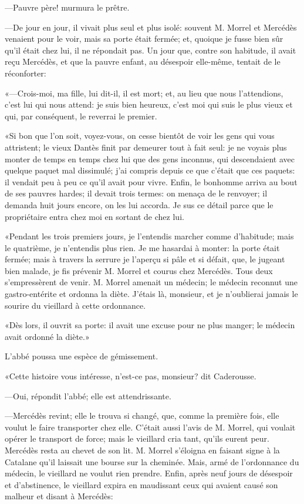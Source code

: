 —Pauvre père! murmura le prêtre.

—De jour en jour, il vivait plus seul et plus isolé: souvent M. Morrel et Mercédès venaient pour le voir, mais sa porte était fermée; et, quoique je fusse bien sûr qu'il était chez lui, il ne répondait pas. Un jour que, contre son habitude, il avait reçu Mercédès, et que la pauvre enfant, au désespoir elle-même, tentait de le réconforter:

«—Crois-moi, ma fille, lui dit-il, il est mort; et, au lieu que nous l'attendions, c'est lui qui nous attend: je suis bien heureux, c'est moi qui suis le plus vieux et qui, par conséquent, le reverrai le premier.

«Si bon que l'on soit, voyez-vous, on cesse bientôt de voir les gens qui vous attristent; le vieux Dantès finit par demeurer tout à fait seul: je ne voyais plus monter de temps en temps chez lui que des gens inconnus, qui descendaient avec quelque paquet mal dissimulé; j'ai compris depuis ce que c'était que ces paquets: il vendait peu à peu ce qu'il avait pour vivre. Enfin, le bonhomme arriva au bout de ses pauvres hardes; il devait trois termes: on menaça de le renvoyer; il demanda huit jours encore, on les lui accorda. Je sus ce détail parce que le propriétaire entra chez moi en sortant de chez lui.

«Pendant les trois premiers jours, je l'entendis marcher comme d'habitude; mais le quatrième, je n'entendis plus rien. Je me hasardai à monter: la porte était fermée; mais à travers la serrure je l'aperçu si pâle et si défait, que, le jugeant bien malade, je fis prévenir M. Morrel et courus chez Mercédès. Tous deux s'empressèrent de venir. M. Morrel amenait un médecin; le médecin reconnut une gastro-entérite et ordonna la diète. J'étais là, monsieur, et je n'oublierai jamais le sourire du vieillard à cette ordonnance.

«Dès lors, il ouvrit sa porte: il avait une excuse pour ne plus manger; le médecin avait ordonné la diète.»

L'abbé poussa une espèce de gémissement.

«Cette histoire vous intéresse, n'est-ce pas, monsieur? dit Caderousse.

—Oui, répondit l'abbé; elle est attendrissante.

—Mercédès revint; elle le trouva si changé, que, comme la première fois, elle voulut le faire transporter chez elle. C'était aussi l'avis de M. Morrel, qui voulait opérer le transport de force; mais le vieillard cria tant, qu'ils eurent peur. Mercédès resta au chevet de son lit. M. Morrel s'éloigna en faisant signe à la Catalane qu'il laissait une bourse sur la cheminée. Mais, armé de l'ordonnance du médecin, le vieillard ne voulut rien prendre. Enfin, après neuf jours de désespoir et d'abstinence, le vieillard expira en maudissant ceux qui avaient causé son malheur et disant à Mercédès:

